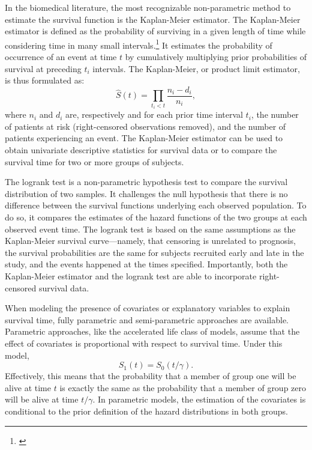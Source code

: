 In the biomedical literature, the most recognizable non-parametric method to
estimate the survival function is the Kaplan-Meier
estimator.\cite{kaplan_nonparametric_1958} The Kaplan-Meier estimator is defined
as the probability of surviving in a given length of time while considering time
in many small intervals.\footnote{\citealp[pp. 365--93]{altman_practical_1990}}
It estimates the probability of occurrence of an event at time $t$ by
cumulatively multiplying prior probabilities of survival at preceding $t_i$
intervals.  The Kaplan-Meier, or product limit estimator, is thus formulated as:
\begin{equation}
  \label{eq:kaplan-meier}
\hat{S}(t)=\prod_{t_i<t}\frac{n_i-d_i}{n_i},
\end{equation}
where $n_i$ and $d_i$ are, respectively and for each prior time interval $t_i$,
the number of patients at risk (right-censored observations removed), and the
number of patients experiencing an event.  The Kaplan-Meier estimator can be
used to obtain univariate descriptive statistics for survival data or to compare
the survival time for two or more groups of subjects.

The logrank test is a non-parametric hypothesis test to compare the survival
distribution of two
samples.\cite{mantel_evaluation_1966,peto_asymptotically_1972} It challenges the
null hypothesis that there is no difference between the survival functions
underlying each observed population. %
To do so, it compares the estimates
of the hazard functions of the two groups at each observed event time.  The
logrank test is based on the same assumptions as the Kaplan-Meier survival
curve---namely, that censoring is unrelated to prognosis, the survival
probabilities are the same for subjects recruited early and late in the study,
and the events happened at the times specified.\cite{bland_logrank_2004}
Importantly, both the Kaplan-Meier estimator and the logrank test are able to
incorporate right-censored survival data.

When modeling the presence of covariates or explanatory variables to explain
survival time, fully parametric and semi-parametric approaches are available.
Parametric approaches, like the accelerated life class of models, assume that
the effect of covariates is proportional with respect to survival
time.\cite{kalbfleisch_statistical_2011} Under this model,
\begin{equation}
  \label{eq:aft}
  S_1(t) = S_0(t/\gamma).
\end{equation}
Effectively, this means that the probability that a member of group one will be
alive at time $t$ is exactly the same as the probability that a member of group
zero will be alive at time $t/\gamma$.  In parametric models, the estimation of
the covariates is conditional to the prior definition of the hazard
distributions in both groups.

